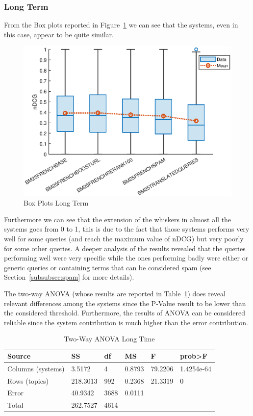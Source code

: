 \subsubsection{Long Term}
\label{subsubsec:lt}
From the Box plots reported in Figure~\ref{fig:LTBP} we can see that the systems, even in this case, appear to be quite similar.
\begin{figure}[tb]
    \centering
    \includegraphics[scale=0.8]{figure/longterm/boxplot.eps}
    \caption{Box Plots Long Term}
    \label{fig:LTBP}
\end{figure}
Furthermore we can see that the extension of the whiskers in almost all the systems goes from 0 to 1, this is due to the fact that those systems performs very well for some queries (and reach the maximum value of nDCG) but very poorly for some other queries. A deeper analysis of the results revealed that the queries performing well were very specific while the ones performing badly were either or generic queries or containing terms that can be considered spam (see Section~\ref{subsubsec:spam} for more details).
\par
The two-way \ac{ANOVA} (whose results are reported in Table~\ref{tab:LTANOVA}) does reveal relevant differences among the systems since the P-Value result to be lower than the considered threshold. Furthermore, the results of \ac{ANOVA} can be considered reliable since the system contribution is much higher than the error contribution.
\begin{table}[tb]
  \caption{Two-Way ANOVA Long Time}
  \label{tab:LTANOVA}
  \centering
  \begin{tabular}{|l|l|l|l|l|l|}
    \toprule
    Source & SS & df & MS & F & prob>F\\
    \midrule
    Columns (systems) & 3.5172 & 4 & 0.8793 & 79.2206 & 1.4254e-64\\
    Rows (topics) & 218.3013 & 992 & 0.2368 & 21.3319 & 0\\
    Error & 40.9342 & 3688 & 0.0111 &  & \\
    Total & 262.7527 & 4614 &  &  & \\
  \bottomrule
\end{tabular}
\end{table}
